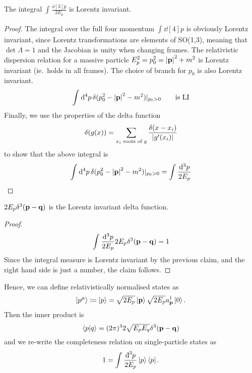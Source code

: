 \begin{claim}
  The integral $\int_{}^{} \frac{\dd[3]{p}}{2 E_p} $ is Lorentz invariant.
\end{claim}
\begin{proof}
  The integral over the full four momentum $\int_{}^{} \dd[4]{p} $ is obviously Lorentz invariant, since Lorentz transformations are elements of SO(1,3), meaning that $\det \Lambda = 1$ and the Jacobian is unity when changing frames.
  The relativistic dispersion relation for a massive particle $E_p^2 = p_0^2 = \abs{\vb{p}}^2 + m^2$ is Lorentz invariant (ie.~holds in all frames). The choice of branch for $p_0$ is also Lorentz invariant.
  \begin{equation}
    \int_{}^{} \dd[4]{p} \delta (p_0^2 - \abs{\vb{p}}^2 - m^2)\rvert_{p_0 >  0} \qquad \text{is LI}
  \end{equation}
  Finally, we use the properties of the delta function
  \begin{equation}
    \delta (g(x)) = \sum_{x_i \text{ roots of } g} \frac{\delta(x - x_i)}{\abs{g'(x_i)}}
  \end{equation}
  to show that the above integral is 
  \begin{equation}
    \int_{}^{} \dd[4]{p} \delta (p_0^2 - \abs{\vb{p}}^2 - m^2)\rvert_{p_0 >  0} = \int_{}^{} \frac{\dd[3]{p}}{2E_p} 
  \end{equation}
\end{proof}

\begin{claim}
  $2E_p \delta^3 (\vb{p}-\vb{q})$ is the Lorentz invariant delta function.
\end{claim}
\begin{proof}
  \begin{equation}
    \int_{}^{} \frac{\dd[3]{p}}{2E_p} 2 E_p \delta^3 (\vb{p}-\vb{q}) = 1
  \end{equation}
  Since the integral measure is Lorentz invariant by the previous claim, and the right hand side is just a number, the claim follows.
\end{proof}

Hence, we can define relativistically normalised states as
\begin{equation}
  \ket{p^\mu} \coloneq \ket{p} = \sqrt{2E_p} \ket{\vb{p}} \sqrt{2 E_p} a_{\vb{p}}^{\dagger} \ket{0}.
\end{equation}
Then the inner product is 
\begin{equation}
  \bra{p}\ket{q} = (2\pi)^3 2 \sqrt{E_p E_q} \delta^3(\vb{p}-\vb{q})
\end{equation}
and we re-write the completeness relation on single-particle states as
\begin{equation}
  1 = \int_{}^{} \frac{\bdd[3]{p}}{2E_p} \ket{p}\bra{p}.
\end{equation}

